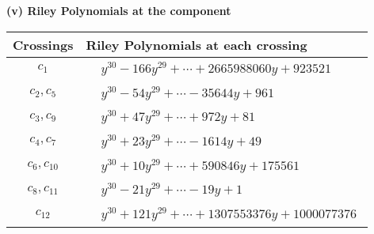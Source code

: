 \documentclass[1p]{elsarticle_modified}
\theoremstyle{definition}
\begin{document}
\flushleft \textbf{(v) Riley Polynomials at the component}\newline \\
\begin{tabular}{m{50pt}|m{274pt}}
Crossings & \hspace{64pt}Riley Polynomials at each crossing \\
\hline $$\begin{aligned}c_{1}\end{aligned}$$&$\begin{aligned}
&y^{30}-166 y^{29}+\cdots+2665988060 y+923521
\end{aligned}$\\
\hline $$\begin{aligned}c_{2},c_{5}\end{aligned}$$&$\begin{aligned}
&y^{30}-54 y^{29}+\cdots-35644 y+961
\end{aligned}$\\
\hline $$\begin{aligned}c_{3},c_{9}\end{aligned}$$&$\begin{aligned}
&y^{30}+47 y^{29}+\cdots+972 y+81
\end{aligned}$\\
\hline $$\begin{aligned}c_{4},c_{7}\end{aligned}$$&$\begin{aligned}
&y^{30}+23 y^{29}+\cdots-1614 y+49
\end{aligned}$\\
\hline $$\begin{aligned}c_{6},c_{10}\end{aligned}$$&$\begin{aligned}
&y^{30}+10 y^{29}+\cdots+590846 y+175561
\end{aligned}$\\
\hline $$\begin{aligned}c_{8},c_{11}\end{aligned}$$&$\begin{aligned}
&y^{30}-21 y^{29}+\cdots-19 y+1
\end{aligned}$\\
\hline $$\begin{aligned}c_{12}\end{aligned}$$&$\begin{aligned}
&y^{30}+121 y^{29}+\cdots+1307553376 y+1000077376
\end{aligned}$\\
\hline
\end{tabular}\\~\\
\end{document}
